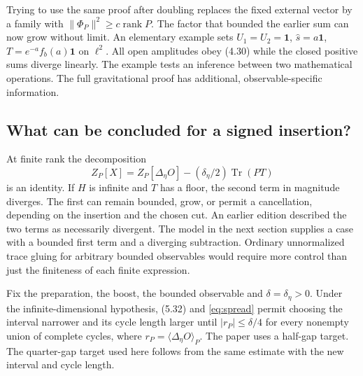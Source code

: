 \documentclass[11pt]{article}
\newcommand{\Tr}{\operatorname{Tr}}
\newcommand{\id}{\mathbf{1}}
\newcommand{\areaop}{\hat s}
\DeclareMathOperator{\rank}{rank}
\begin{document}
Trying to use the same proof after doubling replaces the fixed external vector by a family with $\|\Phi_P\|^2\ge c\rank P$. The factor that bounded the earlier sum can now grow without limit. An elementary example sets $U_1=U_2=\id$, $\areaop=a\id$, $T=e^{-a}f_b(a)\id$ on $\ell^2$. All open amplitudes obey (4.30) while the closed positive sums diverge linearly. The example tests an inference between two mathematical operations. The full gravitational proof has additional, observable-specific information.

\subsection{What can be concluded for a signed insertion?}
At finite rank the decomposition
\[
 Z_P[X]=Z_P[\Delta_\eta O]-(\delta_\eta/2)\Tr(PT)
\]
is an identity. If $H$ is infinite and $T$ has a floor, the second term in magnitude diverges. The first can remain bounded, grow, or permit a cancellation, depending on the insertion and the chosen cut. An earlier edition described the two terms as necessarily divergent. The model in the next section supplies a case with a bounded first term and a diverging subtraction. Ordinary unnormalized trace gluing for arbitrary bounded observables would require more control than just the finiteness of each finite expression.

Fix the preparation, the boost, the bounded observable and $\delta=\delta_\eta>0$. Under the infinite-dimensional hypothesis, (5.32) and \eqref{eq:spread} permit choosing the interval narrower and its cycle length larger until $|r_P|\le\delta/4$ for every nonempty union of complete cycles, where $r_P=\langle\Delta_\eta O\rangle_P$. The paper uses a half-gap target. The quarter-gap target used here follows from the same estimate with the new interval and cycle length.
\end{document}
